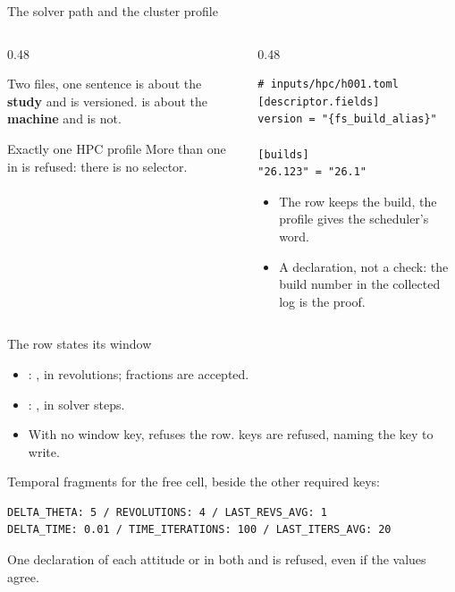 \begin{frame}[fragile]{The solver path and the cluster profile}
\begin{columns}[T]
\begin{column}{0.48\textwidth}
\begin{block}{Two files, one sentence}
\small {} is about the \textbf{study} and is versioned.
 is about the \textbf{machine} and is not.
\end{block}
\begin{alertblock}{Exactly one HPC profile}
\small More than one in  is refused: there is no selector.
\end{alertblock}
\end{column}
\begin{column}{0.48\textwidth}
\begin{lstlisting}[style=ftsbase]
# inputs/hpc/h001.toml
[descriptor.fields]
version = "{fs_build_alias}"

[builds]
"26.123" = "26.1"
\end{lstlisting}
\begin{itemize}\small
  \item The row keeps the build, the profile gives the scheduler's word.
  \item A declaration, not a check: the build number in the collected log is
        the proof.
\end{itemize}
\end{column}
\end{columns}
\end{frame}

\begin{frame}[fragile]{The row states its window}
\begin{itemize}
\item {}: , in revolutions;
fractions are accepted.
\item {}: , in solver steps.
\item With no window key,  refuses the row. 
keys are refused, naming the key to write.
\end{itemize}
\small Temporal fragments for the free cell, beside the other required keys:
\begin{lstlisting}[style=ftsbase]
DELTA_THETA: 5 / REVOLUTIONS: 4 / LAST_REVS_AVG: 1
DELTA_TIME: 0.01 / TIME_ITERATIONS: 100 / LAST_ITERS_AVG: 20
\end{lstlisting}
\begin{alertblock}{One declaration of each attitude}
\small {} or  in both  and
 is refused, even if the values agree.
\end{alertblock}
\end{frame}

